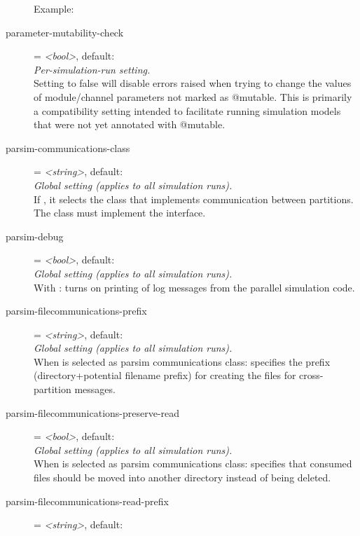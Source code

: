\begin{description}
    Example:
\item[parameter-mutability-check] = \textit{<bool>}, default: \\
    \textit{Per-simulation-run setting.}\\
    Setting to false will disable errors raised when trying to change the
    values of module/channel parameters not marked as @mutable. This is
    primarily a compatibility setting intended to facilitate running simulation
    models that were not yet annotated with @mutable.
\item[parsim-communications-class] = \textit{<string>}, default: \\
    \textit{Global setting (applies to all simulation runs).}\\
    If , it selects the
    class that implements communication between partitions. The class must
    implement the  interface.
\item[parsim-debug] = \textit{<bool>}, default: \\
    \textit{Global setting (applies to all simulation runs).}\\
    With : turns on
    printing of log messages from the parallel simulation code.
\item[parsim-filecommunications-prefix] = \textit{<string>}, default: \\
    \textit{Global setting (applies to all simulation runs).}\\
    When  is selected as parsim communications
    class: specifies the prefix (directory+potential filename prefix) for
    creating the files for cross-partition messages.
\item[parsim-filecommunications-preserve-read] = \textit{<bool>}, default: \\
    \textit{Global setting (applies to all simulation runs).}\\
    When  is selected as parsim communications
    class: specifies that consumed files should be moved into another directory
    instead of being deleted.
\item[parsim-filecommunications-read-prefix] = \textit{<string>}, default: \\

\end{description}
